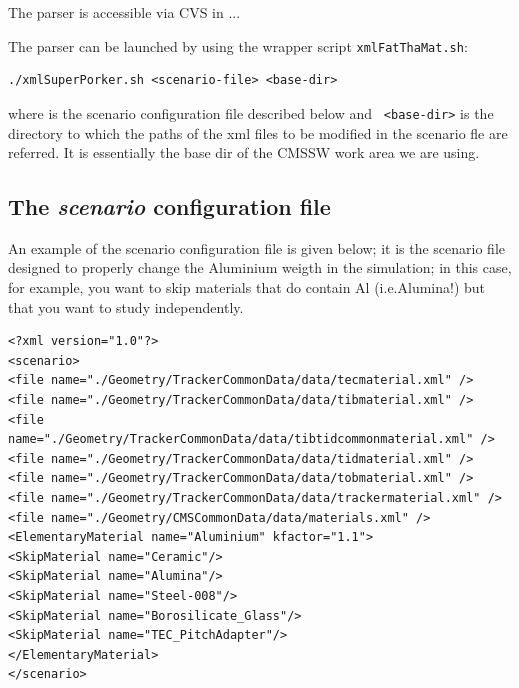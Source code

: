 \documentclass{cmspaper}
\begin{document}
The parser is accessible via CVS in ...

The parser can be launched by using the wrapper script {\tt xmlFatThaMat.sh}:
{\small
\begin{Verbatim}[frame=leftline]
./xmlSuperPorker.sh <scenario-file> <base-dir>
\end{Verbatim}
}
where {\tt <scenario-file>} is the scenario configuration file described below and {\tt 
<base-dir>} is the directory to which the paths of the xml files to be modified in the scenario fle are referred. It is essentially the base dir of the CMSSW work area we are using.


\subsection{The {\em scenario} configuration file}

An example of the scenario configuration file is given below; it is the scenario file designed to properly change the Aluminium weigth in the simulation; in  this case, for example, you want to skip materials that do contain Al (i.e.Alumina!) but that you want to study independently.

{\small
\begin{Verbatim}[frame=leftline]
<?xml version="1.0"?>
<scenario>
<file name="./Geometry/TrackerCommonData/data/tecmaterial.xml" />
<file name="./Geometry/TrackerCommonData/data/tibmaterial.xml" />
<file name="./Geometry/TrackerCommonData/data/tibtidcommonmaterial.xml" />
<file name="./Geometry/TrackerCommonData/data/tidmaterial.xml" />
<file name="./Geometry/TrackerCommonData/data/tobmaterial.xml" />
<file name="./Geometry/TrackerCommonData/data/trackermaterial.xml" />
<file name="./Geometry/CMSCommonData/data/materials.xml" />
<ElementaryMaterial name="Aluminium" kfactor="1.1">
<SkipMaterial name="Ceramic"/>
<SkipMaterial name="Alumina"/>
<SkipMaterial name="Steel-008"/>
<SkipMaterial name="Borosilicate_Glass"/>
<SkipMaterial name="TEC_PitchAdapter"/>
</ElementaryMaterial>
</scenario>
\end{Verbatim}
}
\end{document}
